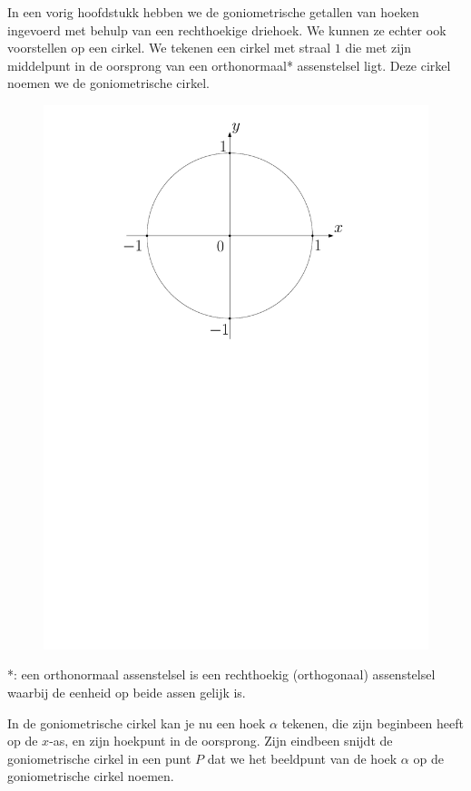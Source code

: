 In een vorig hoofdstukk hebben we de goniometrische getallen van hoeken ingevoerd met behulp van een rechthoekige driehoek. We kunnen ze echter ook voorstellen op een cirkel. We tekenen een cirkel met straal $1$ die met zijn middelpunt in de oorsprong van een orthonormaal* assenstelsel ligt. Deze cirkel noemen we de goniometrische cirkel.
\begin{figure}[h]
\begin{center}
\includegraphics[scale=0.4]{3_gonio_complexe_getallen/inputs/goncirkelleeg.pdf}
\end{center}
\end{figure}

*: een orthonormaal assenstelsel is een rechthoekig (orthogonaal) assenstelsel waarbij de eenheid op beide assen gelijk is.

In de goniometrische cirkel kan je nu een hoek $\alpha$ tekenen, die zijn beginbeen heeft op de $x$-as, en zijn hoekpunt in de oorsprong. Zijn eindbeen snijdt de goniometrische cirkel in een punt $P$ dat we het beeldpunt van de hoek $\alpha$ op de goniometrische cirkel noemen.

